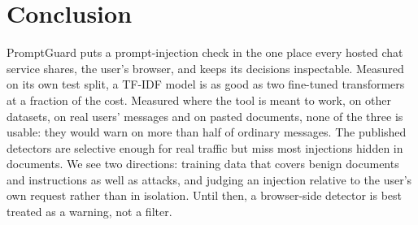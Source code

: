 \documentclass[conference]{IEEEtran}
\begin{document}
\section{Conclusion}
PromptGuard puts a prompt-injection check in the one place every hosted chat service shares, the user's
browser, and keeps its decisions inspectable. Measured on its own test split, a TF-IDF model is as good as
two fine-tuned transformers at a fraction of the cost. Measured where the tool is meant to work, on other
datasets, on real users' messages and on pasted documents, none of the three is usable: they would warn on more
than half of ordinary messages. The published detectors are selective enough for real traffic but miss most
injections hidden in documents. We see two directions: training data that covers benign documents and
instructions as well as attacks, and judging an injection relative to the user's own request rather than in
isolation. Until then, a browser-side detector is best treated as a warning, not a filter.




\clearpage

\end{document}
